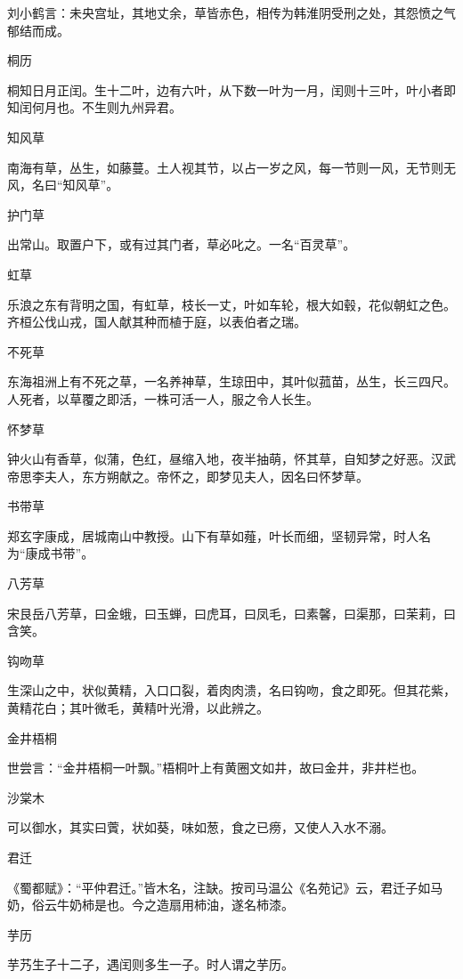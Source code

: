 \documentclass[a4paper,12pt,UTF8,twoside]{ctexbook}
\begin{document}
    刘小鹤言：未央宫址，其地丈余，草皆赤色，相传为韩淮阴受刑之处，其怨愤之气郁结而成。
    
    桐历
    
    桐知日月正闰。生十二叶，边有六叶，从下数一叶为一月，闰则十三叶，叶小者即知闰何月也。不生则九州异君。
    
    知风草
    
    南海有草，丛生，如藤蔓。土人视其节，以占一岁之风，每一节则一风，无节则无风，名曰“知风草”。
    
    护门草
    
    出常山。取置户下，或有过其门者，草必叱之。一名“百灵草”。
    
    虹草
    
    乐浪之东有背明之国，有虹草，枝长一丈，叶如车轮，根大如毂，花似朝虹之色。齐桓公伐山戎，国人献其种而植于庭，以表伯者之瑞。
    
    不死草
    
    东海祖洲上有不死之草，一名养神草，生琼田中，其叶似菰苗，丛生，长三四尺。人死者，以草覆之即活，一株可活一人，服之令人长生。
    
    怀梦草
    
    钟火山有香草，似蒲，色红，昼缩入地，夜半抽萌，怀其草，自知梦之好恶。汉武帝思李夫人，东方朔献之。帝怀之，即梦见夫人，因名曰怀梦草。
    
    书带草
    
    郑玄字康成，居城南山中教授。山下有草如薤，叶长而细，坚韧异常，时人名为“康成书带”。
    
    八芳草
    
    宋艮岳八芳草，曰金蛾，曰玉蝉，曰虎耳，曰凤毛，曰素馨，曰渠那，曰茉莉，曰含笑。
    
    钩吻草
    
    生深山之中，状似黄精，入口口裂，着肉肉溃，名曰钩吻，食之即死。但其花紫，黄精花白；其叶微毛，黄精叶光滑，以此辨之。
    
    金井梧桐
    
    世尝言：“金井梧桐一叶飘。”梧桐叶上有黄圈文如井，故曰金井，非井栏也。
    
    沙棠木
    
    可以御水，其实曰薲，状如葵，味如葱，食之已痨，又使人入水不溺。
    
    君迁
    
    《蜀都赋》：“平仲君迁。”皆木名，注缺。按司马温公《名苑记》云，君迁子如马奶，俗云牛奶柿是也。今之造扇用柿油，遂名柿漆。
    
    芋历
    
    芋艿生子十二子，遇闰则多生一子。时人谓之芋历。
    
\end{document}
